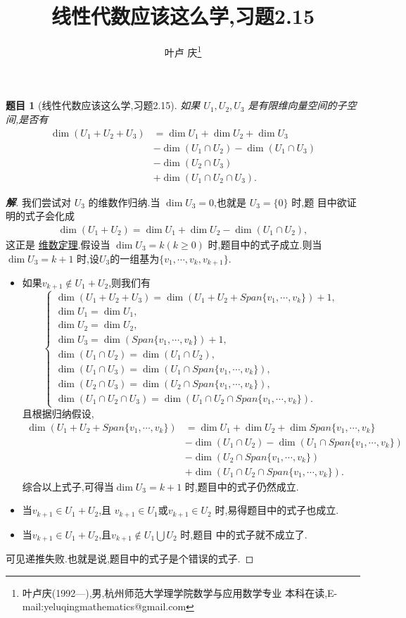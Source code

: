 \documentclass[a4paper]{article}
\newtheorem*{exe}{题目}
\newenvironment{exercise}
{\bigskip\begin{mdframed}\begin{exe}}
    {\end{exe}\end{mdframed}\bigskip}
\begin{document}
\title{\huge{\bf{线性代数应该这么学,习题2.15}}} \author{\small{叶卢
    庆\footnote{叶卢庆(1992---),男,杭州师范大学理学院数学与应用数学专业
      本科在读,E-mail:yeluqingmathematics@gmail.com}}}
\maketitle
\begin{exercise}[线性代数应该这么学,习题2.15]
  如果 $U_1,U_2,U_3$ 是有限维向量空间的子空间,是否有
  \begin{align*}
    \dim (U_1+U_2+U_3)&=\dim U_1+\dim U_2+\dim U_3\\&-\dim(U_1\cap
    U_2)-\dim (U_1\cap U_3)\\&-\dim(U_2\cap U_3)\\&+\dim(U_1\cap U_2\cap U_3).
  \end{align*}
\end{exercise}
\begin{proof}[\textbf{解}]
我们尝试对 $U_3$ 的维数作归纳.当 $\dim U_3=0$,也就是 $U_3=\{0\}$ 时,题
目中欲证明的式子会化成
\begin{align*}
  \dim(U_1+U_2)=\dim U_1+\dim U_2-\dim (U_1\cap U_2),
\end{align*}
这正是
\href{http://blog.sciencenet.cn/home.php?mod=space&uid=604208&do=blog&id=820615}{维数定理}.假设当 $\dim U_3=k(k\geq 0)$ 时,题目中的式子成立.则当 $\dim
U_3=k+1$ 时,设$U_3$的一组基为$\{v_1,\cdots,v_k,v_{k+1}\}$.
\begin{itemize}
\item 如果$v_{k+1}\not\in U_1+U_2$,则我们有
$$
\begin{cases}
  \dim (U_1+U_2+U_3)=\dim (U_1+U_2+Span\{v_1,\cdots,v_k\})+1,\\
\dim U_1=\dim U_1,\\
\dim U_2=\dim U_2,\\
\dim U_3=\dim(Span \{v_1,\cdots,v_k\})+1,\\
\dim (U_1\cap U_2)=\dim (U_1\cap U_2),\\
\dim (U_1\cap U_3)=\dim (U_1\cap Span\{v_1,\cdots,v_k\}),\\
\dim (U_2\cap U_3)=\dim (U_2\cap Span\{v_1,\cdots,v_k\}),\\
\dim (U_1\cap U_2\cap U_3)=\dim (U_1\cap U_2\cap Span\{v_1,\cdots,v_k\}).
\end{cases}
$$
且根据归纳假设,
\begin{align*}
    \dim (U_1+U_2+Span\{v_1,\cdots,v_k\})&=\dim U_1+\dim U_2+\dim Span\{v_1,\cdots,v_k\}\\&-\dim(U_1\cap
    U_2)-\dim (U_1\cap Span\{v_1,\cdots,v_k\})\\&-\dim(U_2\cap Span\{v_1,\cdots,v_k\})\\&+\dim(U_1\cap U_2\cap Span\{v_1,\cdots,v_k\}).
\end{align*}
综合以上式子,可得当$\dim U_3=k+1$ 时,题目中的式子仍然成立.
\item 当$v_{k+1}\in U_1+U_2$,且 $v_{k+1}\in U_1$或$v_{k+1}\in
  U_2$ 时,易得题目中的式子也成立.
\item 当$v_{k+1}\in U_1+U_2$,且$v_{k+1}\not\in U_1\bigcup U_2$ 时,题目
  中的式子就不成立了.
\end{itemize}
可见递推失败.也就是说,题目中的式子是个错误的式子.
\end{proof}
\end{document}
